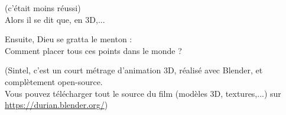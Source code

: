 \documentclass[compress]{beamer}
\begin{document}
\begin{frame}{}
    \begin{center}
        (c'était moins réussi)\\[1em]

        Alors il se dit que, en 3D,...\\[1em]

    \end{center}

\end{frame}

\begin{frame}{}
    Ensuite, Dieu se gratta le menton : \\[1em] 
    Comment placer tous ces points dans le monde ? \\[2em]

\end{frame}


\begin{frame}{}
    \begin{center}
        ({\Medium Sintel}, c'est un court métrage d'animation 3D, réalisé avec Blender, et
    complètement open-source.\\
    
    Vous pouvez télécharger tout le {\Medium source} du
    film (modèles 3D, textures,...) sur
    \url{https://durian.blender.org/})
    \end{center}
\end{frame}
\end{document}
